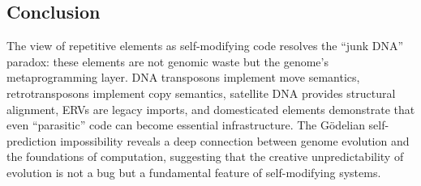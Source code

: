 \documentclass[12pt,a4paper]{article}
\begin{document}
\subsection{Conclusion}

The view of repetitive elements as self-modifying code resolves the ``junk DNA'' paradox:
these elements are not genomic waste but the genome's metaprogramming layer. DNA transposons
implement move semantics, retrotransposons implement copy semantics, satellite DNA provides
structural alignment, ERVs are legacy imports, and domesticated elements demonstrate that
even ``parasitic'' code can become essential infrastructure. The G\"odelian self-prediction
impossibility reveals a deep connection between genome evolution and the foundations of
computation, suggesting that the creative unpredictability of evolution is not a bug but
a fundamental feature of self-modifying systems.
\end{document}
